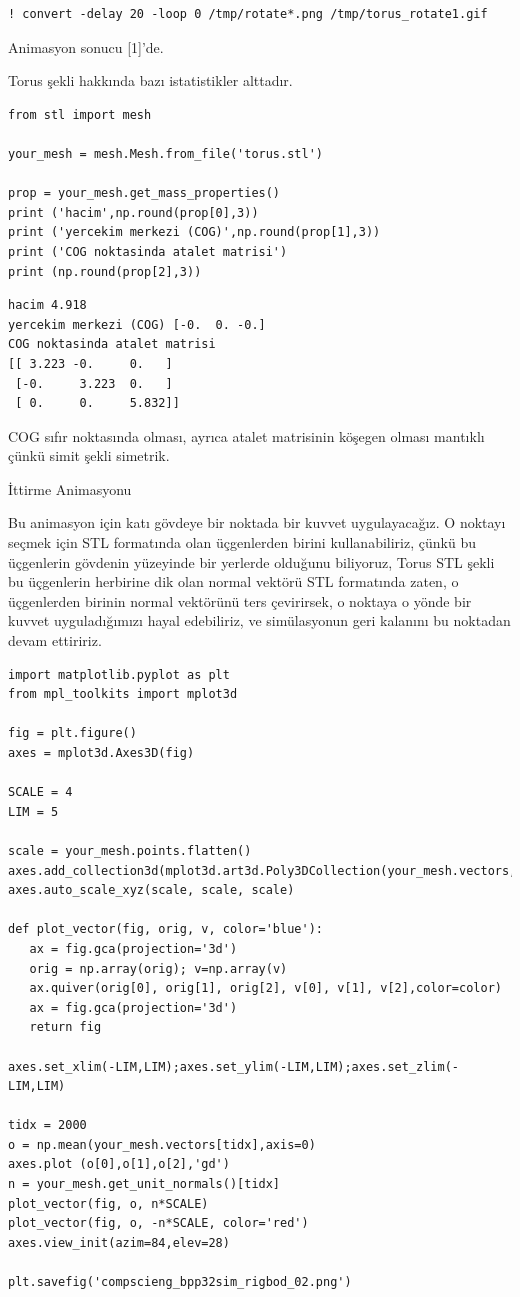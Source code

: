 \documentclass[12pt,fleqn]{article}\usepackage{../../common}
\begin{document}
\begin{verbatim}
! convert -delay 20 -loop 0 /tmp/rotate*.png /tmp/torus_rotate1.gif
\end{verbatim}

Animasyon sonucu [1]'de.

Torus şekli hakkında bazı istatistikler alttadır.

\begin{verbatim}
from stl import mesh

your_mesh = mesh.Mesh.from_file('torus.stl')

prop = your_mesh.get_mass_properties()
print ('hacim',np.round(prop[0],3))
print ('yercekim merkezi (COG)',np.round(prop[1],3))
print ('COG noktasinda atalet matrisi')
print (np.round(prop[2],3))
\end{verbatim}

\begin{verbatim}
hacim 4.918
yercekim merkezi (COG) [-0.  0. -0.]
COG noktasinda atalet matrisi
[[ 3.223 -0.     0.   ]
 [-0.     3.223  0.   ]
 [ 0.     0.     5.832]]
\end{verbatim}

COG sıfır noktasında olması, ayrıca atalet matrisinin köşegen olması mantıklı
çünkü simit şekli simetrik.

İttirme Animasyonu

Bu animasyon için katı gövdeye bir noktada bir kuvvet uygulayacağız. O noktayı
seçmek için STL formatında olan üçgenlerden birini kullanabiliriz, çünkü bu
üçgenlerin gövdenin yüzeyinde bir yerlerde olduğunu biliyoruz, Torus STL şekli
bu üçgenlerin herbirine dik olan normal vektörü STL formatında zaten, o
üçgenlerden birinin normal vektörünü ters çevirirsek, o noktaya o yönde bir
kuvvet uyguladığımızı hayal edebiliriz, ve simülasyonun geri kalanını bu
noktadan devam ettiririz.

\begin{verbatim}
import matplotlib.pyplot as plt
from mpl_toolkits import mplot3d

fig = plt.figure()
axes = mplot3d.Axes3D(fig)

SCALE = 4
LIM = 5

scale = your_mesh.points.flatten()
axes.add_collection3d(mplot3d.art3d.Poly3DCollection(your_mesh.vectors,alpha=0.3))
axes.auto_scale_xyz(scale, scale, scale)

def plot_vector(fig, orig, v, color='blue'):
   ax = fig.gca(projection='3d')
   orig = np.array(orig); v=np.array(v)
   ax.quiver(orig[0], orig[1], orig[2], v[0], v[1], v[2],color=color)
   ax = fig.gca(projection='3d')  
   return fig

axes.set_xlim(-LIM,LIM);axes.set_ylim(-LIM,LIM);axes.set_zlim(-LIM,LIM)

tidx = 2000
o = np.mean(your_mesh.vectors[tidx],axis=0)
axes.plot (o[0],o[1],o[2],'gd')
n = your_mesh.get_unit_normals()[tidx]
plot_vector(fig, o, n*SCALE)
plot_vector(fig, o, -n*SCALE, color='red')
axes.view_init(azim=84,elev=28)

plt.savefig('compscieng_bpp32sim_rigbod_02.png')
\end{verbatim}
\end{document}
